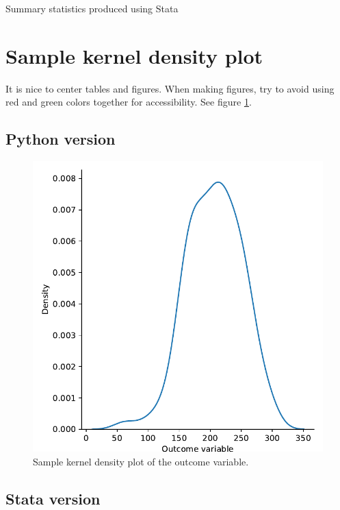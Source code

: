 \documentclass{article}
\begin{document}
\begin{table}[ht]
    \centering
    
    \caption{Summary statistics produced using Stata}
    \label{tab:statasummary}
\end{table}

\section{Sample kernel density plot}
It is nice to center tables and figures.  When making figures, try to avoid using red and green colors together for accessibility.  See figure \ref{fig:samplehist}.

\subsection{Python version}

\begin{figure}[ht]
    \centering
    \includegraphics[scale = 0.7]{samplehist.pdf}
    \caption{Sample kernel density plot of the outcome variable.}
    \label{fig:samplehist}
\end{figure}

\subsection{Stata version}
\end{document}
